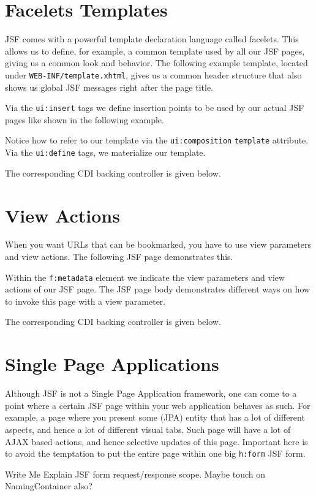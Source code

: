 \section{Facelets Templates}
JSF comes with a powerful template declaration language called facelets.
This allows us to define, for example, a common template used by all our JSF pages,
giving us a common look and behavior.
The following example template, located under \texttt{WEB-INF/template.xhtml},
gives us a common header structure that also shows us global JSF messages right after the page title.

Via the \texttt{ui:insert} tags we define insertion points to be used by our actual JSF pages like shown in the following example.

Notice how to refer to our template via the \texttt{ui:composition} \texttt{template} attribute.
Via the \texttt{ui:define} tags, we materialize our template.

The corresponding CDI backing controller is given below.


\section{View Actions}
When you want URLs that can be bookmarked, you have to use view parameters and view actions.
The following JSF page demonstrates this.

Within the \texttt{f:metadata} element we indicate the view parameters and view actions of our JSF page.
The JSF page body demonstrates different ways on how to invoke this page with a view parameter.

The corresponding CDI backing controller is given below.


\section{Single Page Applications}
Although JSF is not a Single Page Application framework, one can come to a point where a certain JSF page within your web application behaves as such.
For example, a page where you present some (JPA) entity that has a lot of different aspects, and hence a lot of different visual tabs.
Such page will have a lot of AJAX based actions, and hence selective updates of this page.
Important here is to avoid the temptation to put the entire page within one big \texttt{h:form} JSF form.
\begin{TODO}{Write Me}
Explain JSF form request/response scope.
Maybe touch on NamingContainer also?
\end{TODO}